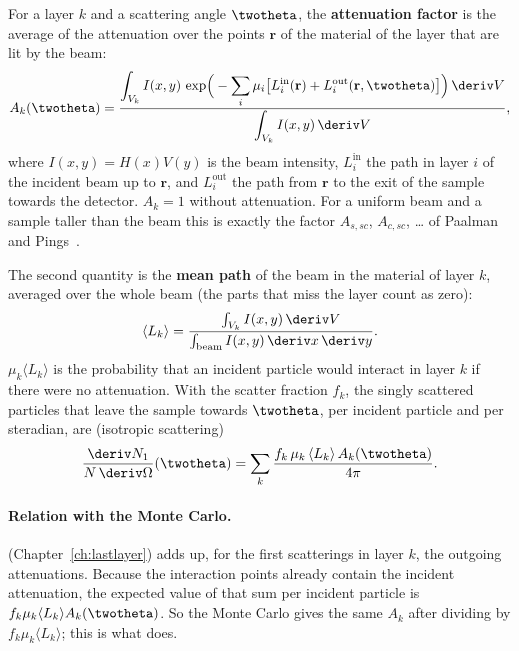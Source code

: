 For a layer $k$ and a scattering angle $\twotheta$, the \textbf{attenuation factor} is the average of the attenuation over the points $\mathbf r$ of the
material of the layer that are lit by the beam:
\begin{equation}
  A_k(\twotheta)=\frac{\displaystyle\int_{V_k} I(x,y)\,\exp\!\Big(-\sum_i\mu_i\big[L^{\mathrm{in}}_i(\mathbf r)+L^{\mathrm{out}}_i(\mathbf r,\twotheta)\big]\Big)\,\deriv V}
                     {\displaystyle\int_{V_k} I(x,y)\,\deriv V},
  \label{eq:Ak}
\end{equation}
where $I(x,y)=H(x)V(y)$ is the beam intensity, $L^{\mathrm{in}}_i$ the path in layer $i$ of the incident beam up to $\mathbf r$, and
$L^{\mathrm{out}}_i$ the path from $\mathbf r$ to the exit of the sample towards the detector. $A_k=1$ without attenuation. For a uniform beam and a
sample taller than the beam this is exactly the factor $A_{s,sc}$, $A_{c,sc}$, \dots{} of Paalman and Pings~\cite{pp}.

The second quantity is the \textbf{mean path} of the beam in the material of layer $k$, averaged over the whole beam (the parts that miss the layer
count as zero):
\begin{equation}
  \langle L_k\rangle=\frac{\int_{V_k} I(x,y)\,\deriv V}{\int_{\text{beam}} I(x,y)\,\deriv x\,\deriv y}.
\end{equation}
$\mu_k\langle L_k\rangle$ is the probability that an incident particle would interact in layer $k$ if there were no attenuation. With the scatter
fraction $f_k$, the singly scattered particles that leave the sample towards $\twotheta$, per incident particle and per steradian, are (isotropic
scattering)
\begin{equation}
  \frac{\deriv N_1}{N\,\deriv\Omega}(\twotheta)=\sum_k\frac{f_k\,\mu_k\,\langle L_k\rangle\,A_k(\twotheta)}{4\pi}.
  \label{eq:single-sr}
\end{equation}

\paragraph{Relation with the Monte Carlo.}  (Chapter~\ref{ch:lastlayer}) adds up, for the first scatterings in
layer $k$, the outgoing attenuations. Because the interaction points already contain the incident attenuation, the expected value of that sum per
incident particle is $f_k\mu_k\langle L_k\rangle A_k(\twotheta)$. So the Monte Carlo gives the same $A_k$ after dividing by
$f_k\mu_k\langle L_k\rangle$; this is what  does.


